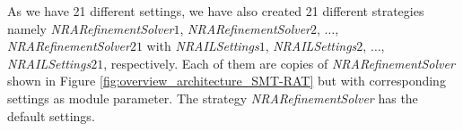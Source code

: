 \noindent As we have 21 different settings, we have also created 21 different strategies namely \textit{NRARefinementSolver$1$}, \textit{NRARefinementSolver$2$}, $\dots$, \textit{NRARefinementSolver$21$} with \textit{NRAILSettings$1$}, \textit{NRAILSettings$2$}, $\dots$, \textit{NRAILSettings$21$}, respectively.
Each of them are copies of \textit{NRARefinementSolver} shown in Figure \ref{fig:overview_architecture_SMT-RAT} but with corresponding settings as module parameter.
The strategy \textit{NRARefinementSolver} has the default settings.\newline